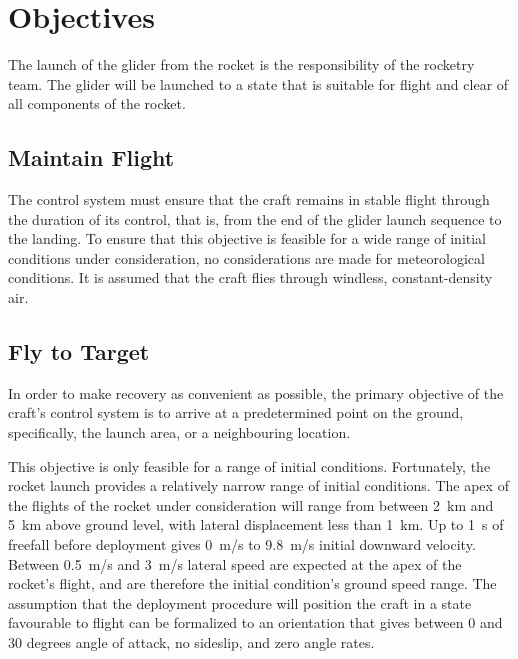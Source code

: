 \documentclass{sydeStyle}
\begin{document}
\chapter{Objectives}
\label{sec:objs}

The launch of the glider from the rocket is the responsibility of the rocketry
team. The glider will be launched to a state that is suitable for flight and
clear of all components of the rocket.

\section{Maintain Flight}
\label{sec:obj1}

The control system must ensure that the craft remains in stable flight through
the duration of its control, that is, from the end of the glider launch sequence
to the landing. To ensure that this objective is feasible for a wide range of
initial conditions under consideration, no considerations are
made for meteorological conditions. It is assumed that the craft flies through
windless, constant-density air.

\section{Fly to Target}
\label{sec:obj2}

In order to make recovery as convenient as possible, the primary objective of
the craft's control system is to arrive at a predetermined point on the ground,
specifically, the launch area, or a neighbouring location.

This objective is only feasible for a range of initial conditions. Fortunately,
the rocket launch provides a relatively narrow range of initial conditions. The
apex of the flights of the rocket under consideration will range from between
2~km and 5~km above ground level, with lateral displacement less than 1~km. Up
to 1~s of freefall before deployment gives 0~m/s to 9.8~m/s initial downward
velocity. Between 0.5~m/s and 3~m/s lateral speed are expected at the apex of
the rocket's flight, and are therefore the initial condition's ground speed
range. The assumption that the deployment procedure will position the craft in
a state favourable to flight can be formalized to an orientation that gives
between 0 and 30 degrees angle of attack, no sideslip, and zero angle rates.
\end{document}
